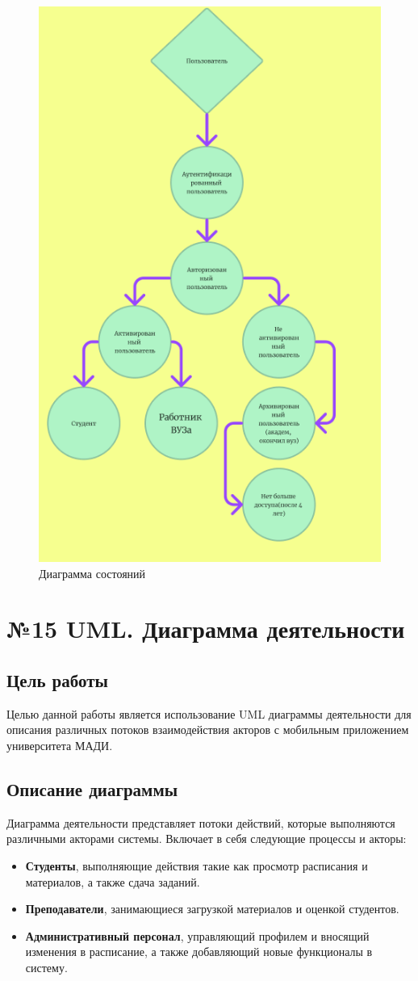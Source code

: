 \documentclass[a4paper,12pt]{article}
\begin{document}
\begin{figure}[-h]
    \centering
    \includegraphics[width=0.5\linewidth]{14UML.png}
    \caption{Диаграмма состояний}
\end{figure}

\clearpage
\section{№15 UML. Диаграмма деятельности}

\subsection{Цель работы}
Целью данной работы является использование UML диаграммы деятельности для описания различных потоков взаимодействия акторов с мобильным приложением университета МАДИ.

\subsection{Описание диаграммы}
Диаграмма деятельности представляет потоки действий, которые выполняются различными акторами системы. Включает в себя следующие процессы и акторы:

\begin{itemize}
    \item \textbf{Студенты}, выполняющие действия такие как просмотр расписания и материалов, а также сдача заданий.
    \item \textbf{Преподаватели}, занимающиеся загрузкой материалов и оценкой студентов.
    \item \textbf{Административный персонал}, управляющий профилем и вносящий изменения в расписание, а также добавляющий новые функционалы в систему.
\end{itemize}
\end{document}
